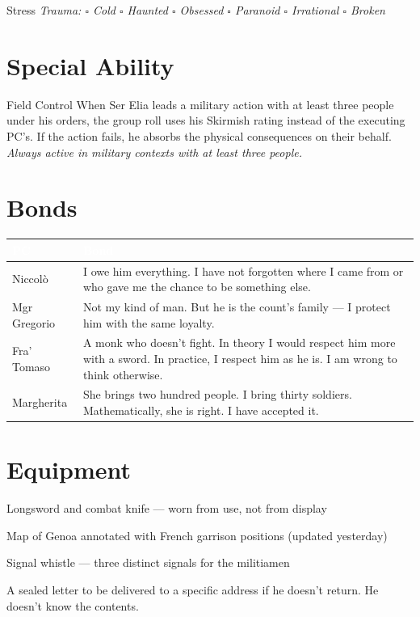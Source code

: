 \medskip
\begin{pgclockbox}{Stress \hfill {}}
\small\textit{Trauma: $\square$ Cold \quad $\square$ Haunted \quad $\square$ Obsessed \quad $\square$ Paranoid \quad $\square$ Irrational \quad $\square$ Broken}
\end{pgclockbox}

\section*{Special Ability}
\begin{fieschibox}{Field Control}
When Ser Elia leads a military action with at least three people under his orders,
the group roll uses his Skirmish rating instead of the executing PC's. If the action
fails, he absorbs the physical consequences on their behalf.
\textit{Always active in military contexts with at least three people.}
\end{fieschibox}

\section*{Bonds}
\begin{table}[h]\centering\renewcommand{\arraystretch}{1.4}
\begin{tabularx}{\linewidth}{@{}L{2.6cm} X@{}}
\toprule{}
\textcolor{white}{\textbf{PC}} & \textcolor{white}{\textbf{Bond}} \\
\midrule
Niccol\`o & I owe him everything. I have not forgotten where I came from or who gave me the chance to be something else. \\
Mgr Gregorio & Not my kind of man. But he is the count's family --- I protect him with the same loyalty. \\
Fra' Tomaso & A monk who doesn't fight. In theory I would respect him more with a sword. In practice, I respect him as he is. I am wrong to think otherwise. \\
Margherita & She brings two hundred people. I bring thirty soldiers. Mathematically, she is right. I have accepted it. \\
\bottomrule
\end{tabularx}
\end{table}

\section*{Equipment}
\begin{goldlist}
\item Longsword and combat knife --- worn from use, not from display
\item Map of Genoa annotated with French garrison positions (updated yesterday)
\item Signal whistle --- three distinct signals for the militiamen
\item A sealed letter to be delivered to a specific address if he doesn't return. He doesn't know the contents.
\end{goldlist}

